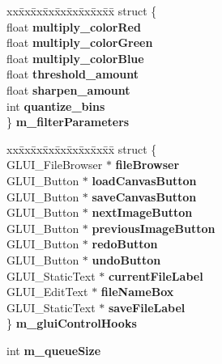 \begin{DoxyCompactItemize}
\item 
\begin{tabbing}
xx\=xx\=xx\=xx\=xx\=xx\=xx\=xx\=xx\=\kill
struct \{\\
\>float {\bfseries multiply\_colorRed}\\
\>float {\bfseries multiply\_colorGreen}\\
\>float {\bfseries multiply\_colorBlue}\\
\>float {\bfseries threshold\_amount}\\
\>float {\bfseries sharpen\_amount}\\
\>int {\bfseries quantize\_bins}\\
\} {\bfseries m\_filterParameters}\hypertarget{classMIAApp_aadde07e49790ace41b94a956b4aec879}{}\label{classMIAApp_aadde07e49790ace41b94a956b4aec879}
\\

\end{tabbing}\item 
\begin{tabbing}
xx\=xx\=xx\=xx\=xx\=xx\=xx\=xx\=xx\=\kill
struct \{\\
\>GLUI\_FileBrowser $\ast$ {\bfseries fileBrowser}\\
\>GLUI\_Button $\ast$ {\bfseries loadCanvasButton}\\
\>GLUI\_Button $\ast$ {\bfseries saveCanvasButton}\\
\>GLUI\_Button $\ast$ {\bfseries nextImageButton}\\
\>GLUI\_Button $\ast$ {\bfseries previousImageButton}\\
\>GLUI\_Button $\ast$ {\bfseries redoButton}\\
\>GLUI\_Button $\ast$ {\bfseries undoButton}\\
\>GLUI\_StaticText $\ast$ {\bfseries currentFileLabel}\\
\>GLUI\_EditText $\ast$ {\bfseries fileNameBox}\\
\>GLUI\_StaticText $\ast$ {\bfseries saveFileLabel}\\
\} {\bfseries m\_gluiControlHooks}\hypertarget{classMIAApp_ae31dbaca4027f2fafedf5f53c82f5f94}{}\label{classMIAApp_ae31dbaca4027f2fafedf5f53c82f5f94}
\\

\end{tabbing}\item 
int {\bfseries m\+\_\+queue\+Size}\hypertarget{classMIAApp_ad0202f7915124446e7347768378f6f09}{}\label{classMIAApp_ad0202f7915124446e7347768378f6f09}


\end{DoxyCompactItemize}
